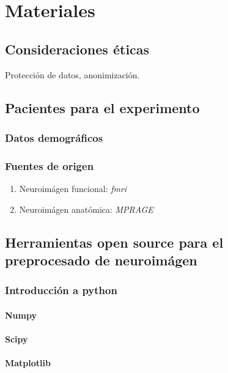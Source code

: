 \chapter{Materiales}
\section{Consideraciones éticas}
Protección de datos, anonimización.
\section{Pacientes para el experimento}

\subsection{Datos demográficos}

\subsection{Fuentes de origen}

\begin{enumerate}
\item Neuroimágen funcional: \textit{fmri}
\item Neuroimágen anatómica: \textit{MPRAGE}
\end{enumerate}

\section{Herramientas open source para el preprocesado de neuroimágen}

\subsection{Introducción a python}

\subsubsection{Numpy}
\subsubsection{Scipy}
\subsubsection{Matplotlib}


